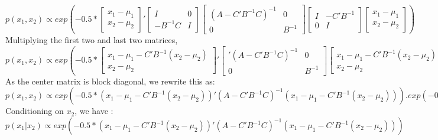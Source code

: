 \begin{enumerate}
{$p(x_{1}, x_{2}) \propto exp( -0.5 * 
	\begin{bmatrix}
	x_{1} - \mu_{1} \\
	x_{2} - \mu_{2} 
	\end{bmatrix}'
	\begin{bmatrix}
	I & 0 \\
	-B^{-1}C & I   
	\end{bmatrix} 
	\begin{bmatrix}
	(A-C'B^{-1}C)^{-1} & 0 \\
	0 & B^{-1}   
	\end{bmatrix} 
	\begin{bmatrix}
	I & -C'B^{-1} \\
	0 & I   
	\end{bmatrix}
	\begin{bmatrix}
	x_{1} - \mu_{1} \\
	x_{2} - \mu_{2} 
	\end{bmatrix} )$ \\	
	
	Multiplying the first two and last two matrices,\\

$p(x_{1}, x_{2}) \propto exp( -0.5 * 
	\begin{bmatrix}
	x_{1} - \mu_{1} - C'B^{-1} (x_{2} - \mu_{2}) \\
	x_{2} - \mu_{2} 
	\end{bmatrix}'
	\begin{bmatrix}'
	(A-C'B^{-1}C)^{-1} & 0 \\
	0 & B^{-1}   
	\end{bmatrix} 
	\begin{bmatrix}
	x_{1} - \mu_{1} - C'B^{-1} (x_{2} - \mu_{2}) \\
	x_{2} - \mu_{2} 
	\end{bmatrix} )$\\ 	
		
	As the center matrix is block diagonal, we rewrite this as:\\		

$p(x_{1}, x_{2}) \propto exp( -0.5 * 
	(x_{1} - \mu_{1} - C'B^{-1} (x_{2} - \mu_{2}))'
	(A-C'B^{-1}C)^{-1}
	(x_{1} - \mu_{1} - C'B^{-1} (x_{2} - \mu_{2}))) . exp( -0.5 * (x_{2} - \mu_{2})'B^{-1}(x_{2} - \mu_{2}) )$\\

	Conditioning on $x_{2}$,	 we have :\\		
	
	$p(x_{1} | x_{2}) \propto exp( -0.5 * 
	(x_{1} - \mu_{1} - C'B^{-1} (x_{2} - \mu_{2}))'
	(A-C'B^{-1}C)^{-1}
	(x_{1} - \mu_{1} - C'B^{-1} (x_{2} - \mu_{2}))) $\\
		
}
\end{enumerate}
